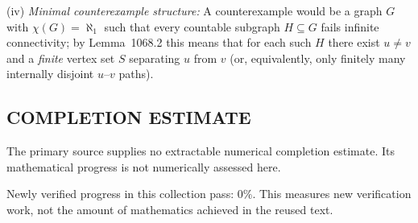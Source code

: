 (iv) \emph{Minimal counterexample structure:}
A counterexample would be a graph $G$ with $\chi(G)=\aleph_1$ such that every countable subgraph $H\subseteq G$ fails infinite connectivity; by Lemma~1068.2 this means that for each such $H$ there exist $u\ne v$ and a \emph{finite} vertex set $S$ separating $u$ from $v$ (or, equivalently, only finitely many internally disjoint $u$--$v$ paths).




\subsection*{COMPLETION ESTIMATE}
The primary source supplies no extractable numerical completion estimate. Its mathematical progress is not numerically assessed here.

Newly verified progress in this collection pass: $0\%$. This measures new verification work, not the amount of mathematics achieved in the reused text.
